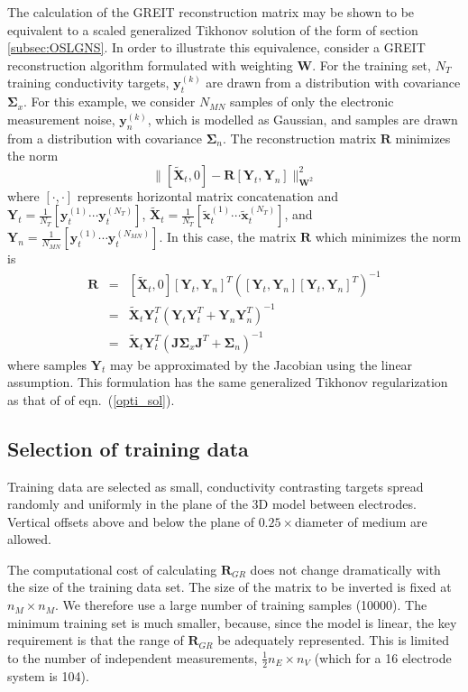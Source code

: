 \documentclass[12pt]{iopart}
\newcommand{\xT}{\mbox{$\mathbf{\tilde x}$}}
\newcommand{\XT}{\mbox{$\mathbf{\tilde X}$}}
\newcommand{\yB}{\mbox{$\mathbf{y}$}}
\newcommand{\RB}{\mbox{$\mathbf{R}$}}
\newcommand{\JB}{\mbox{$\mathbf{J}$}}
\newcommand{\WB}{\mbox{$\mathbf{W}$}}
\newcommand{\YB}{\mbox{$\mathbf{Y}$}}
\newcommand{\SG}{\mbox{${\boldsymbol \Sigma}$}}
\begin{document}
The calculation of the GREIT reconstruction matrix
may be shown to be equivalent to a scaled generalized
Tikhonov solution of the form of section \ref{subsec:OSLGNS}.
In order to illustrate this equivalence, consider
a GREIT reconstruction algorithm formulated
with weighting $\WB$. For the training set,
$N_T$ training conductivity targets, $\yB_t^{(k)}$ are drawn from
a distribution with covariance $\SG_x$.
For this example, we consider $N_{MN}$ samples of only the electronic
measurement noise, $\yB_n^{(k)}$, which is modelled as Gaussian,
and samples are drawn from a distribution with 
covariance $\SG_n$. The reconstruction matrix $\RB$ minimizes
the norm
\begin{equation}
\| [ \XT_t, 0 ] - \RB [ \YB_t, \YB_n ] \|_{\WB^2}^2
\end{equation}
where $[\cdot,\cdot]$ represents horizontal
matrix concatenation and
$\YB_t = \frac{1}{N_T}    [ \yB_t^{(1)} \cdots \yB_t^{(N_T)} ]$,
$\XT_t = \frac{1}{N_T}    [ \xT_t^{(1)} \cdots \xT_t^{(N_T)} ]$,
and 
$\YB_n = \frac{1}{N_{MN}} [ \yB_t^{(1)} \cdots \yB_t^{(N_{MN})} ]$.
In this case, the matrix $\RB$ which minimizes the norm is 
\begin{eqnarray}
\RB &=& [ \XT_t, 0 ] [\YB_t, \YB_n]^T
     \left( [\YB_t, \YB_n] [\YB_t, \YB_n]^T \right)^{-1}
\nonumber \\
    &=& \XT_t \YB_t^T \left( \YB_t \YB_t^T + \YB_n \YB_n^T \right)^{-1}
\nonumber \\
    &=& \XT_t \YB_t^T \left( \JB \SG_x \JB^T + \SG_n \right)^{-1}
\end{eqnarray}
where samples $\YB_t$ may be approximated by the Jacobian
using the linear assumption. This formulation 
has the same generalized Tikhonov regularization as that of
of eqn.\ (\ref{opti_sol}).


\subsection{Selection of training data}
\label{subsec:training_data}

Training data are selected as small, conductivity contrasting
targets spread randomly and uniformly in the plane of the 3D model
between electrodes. Vertical offsets above and below the
plane of $0.25\times$diameter of medium are allowed.

The computational cost of calculating $\RB_{GR}$ does
not change dramatically with the size of the training data
set. The size of the matrix to be inverted is fixed at
$n_M \times n_M$. We therefore use a large number of
training samples (10000). The minimum training set 
is much smaller, because, since the model is
linear, the key requirement is that the range of 
$\RB_{GR}$ be adequately represented. This is limited
to the number of independent measurements,
$\frac{1}{2} n_E \times n_V$ (which for a 16 electrode
system is 104).
\end{document}
